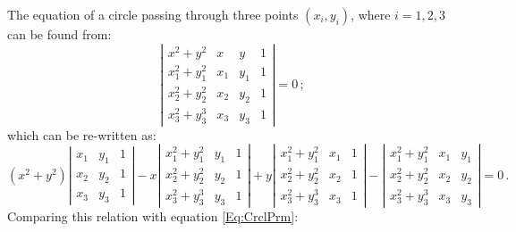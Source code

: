 The equation of a circle passing through three points $(x_i,y_i)$,
where $i=1,2,3$ can be found from:
\begin{equation}
  \left|
    \begin{matrix}
      x^2+y^2     & x  & y   & 1   \\
      x_1^2+y_1^2 & x_1 & y_1 & 1   \\
      x_2^2+y_2^2 & x_2 & y_2 & 1   \\
      x_3^2+y_3^3 & x_3 & y_3 & 1
    \end{matrix}
  \right|
  =0 \, ;
\end{equation}
which can be re-written as:
\begin{equation}
  (x^2+y^2)
  \left|
    \begin{matrix}
      x_1 & y_1 & 1 \\
      x_2 & y_2 & 1 \\
      x_3 & y_3 & 1
    \end{matrix}
  \right|
  -x
  \left|
    \begin{matrix}
      x_1^2+y_1^2 & y_1 & 1 \\
      x_2^2+y_2^2 & y_2 & 1 \\
      x_3^2+y_3^3 & y_3 & 1
    \end{matrix}
  \right|
  +y
  \left|
    \begin{matrix}
      x_1^2+y_1^2 & x_1 & 1 \\
      x_2^2+y_2^2 & x_2 & 1 \\
      x_3^2+y_3^3 & x_3 & 1
    \end{matrix}
  \right|
  -
  \left|
    \begin{matrix}
      x_1^2+y_1^2 & x_1 & y_1 \\
      x_2^2+y_2^2 & x_2 & y_2 \\
      x_3^2+y_3^3 & x_3 & y_3
    \end{matrix}
  \right|
  =0 \, .
\end{equation}
Comparing this relation with equation \ref{Eq:CrclPrm}:
